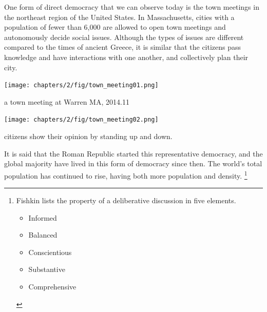 One form of direct democracy that we can observe today is the town meetings in the northeast region of the United States. In Massachusetts, cities with a population of fewer than 6,000 are allowed to open town meetings and autonomously decide social issues. Although the types of issues are different compared to the times of ancient Greece, it is similar that the citizens pass knowledge and have interactions with one another, and collectively plan their city.


\begin{marginfigure}[{-15cm}]
  \texttt{[image: chapters/2/fig/town\_meeting01.png]}               
  \caption[town meetings: moderator]{a town meeting at Warren MA, 2014.11}
  \label{fig:town_meeting}
\end{marginfigure}

\begin{marginfigure}[{-5cm}]
  \texttt{[image: chapters/2/fig/town\_meeting02.png]}               
  \caption[town meetings: voting]{citizens show their opinion by standing up and down.}
  \label{fig:spin_margin}
\end{marginfigure}

It is said that the Roman Republic started this representative democracy, and the global majority have lived in this form of democracy since then. The world's total population has continued to rise, having both more population and density.
\footnote{Fishkin lists the property of a deliberative discussion in five elements. \cite{fishkin2005experimenting}
\begin{itemize}
    \item Informed
    \item Balanced
    \item Conscientious
    \item Substantive
    \item Comprehensive
\end{itemize}
}


